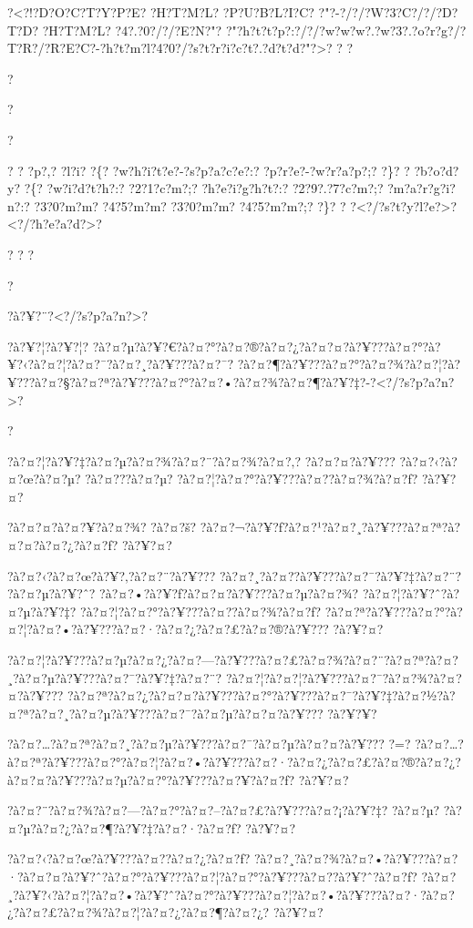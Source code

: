 \documentclass[11pt, openany]{book}
\begin{document}
{{{{{{{?\textless{}?!?D?O?C?T?Y?P?E? ?H?T?M?L? ?P?U?B?L?I?C?
?"?-?/?/?W?3?C?/?/?D?T?D? ?H?T?M?L? ?4?.?0?/?/?E?N?"?
?"?h?t?t?p?:?/?/?w?w?w?.?w?3?.?o?r?g?/?T?R?/?R?E?C?-?h?t?m?l?4?0?/?s?t?r?i?c?t?.?d?t?d?"?\textgreater{}?
? ?

?

?

?

? ? ?p?,? ?l?i? ?\{? ?w?h?i?t?e?-?s?p?a?c?e?:? ?p?r?e?-?w?r?a?p?;? ?\}?
? ?b?o?d?y? ?\{? ?w?i?d?t?h?:? ?2?1?c?m?;? ?h?e?i?g?h?t?:?
?2?9?.?7?c?m?;? ?m?a?r?g?i?n?:? ?3?0?m?m? ?4?5?m?m? ?3?0?m?m?
?4?5?m?m?;? ?\}? ?
?\textless{}?/?s?t?y?l?e?\textgreater{}?\textless{}?/?h?e?a?d?\textgreater{}?

? ? ?

?

?à?¥?¨?\textless{}?/?s?p?a?n?\textgreater{}?

?à?¥?¦?à?¥?¦?
?à?¤?µ?à?¥?€?à?¤?°?à?¤?®?à?¤?¿?à?¤?¤?à?¥???à?¤?°?à?¥?‹?à?¤?¦?à?¤?¯?à?¤?¸?à?¥???à?¤?¯?
?à?¤?¶?à?¥???à?¤?°?à?¤?¾?à?¤?¦?à?¥???à?¤?§?à?¤?ª?à?¥???à?¤?°?à?¤?•?à?¤?¾?à?¤?¶?à?¥?‡?-?\textless{}?/?s?p?a?n?\textgreater{}?

?

?à?¤?¦?à?¥?‡?à?¤?µ?à?¤?¾?à?¤?¨?à?¤?¾?à?¤?‚? ?à?¤?¤?à?¥???
?à?¤?‹?à?¤?œ?à?¤?µ? ?à?¤???à?¤?µ? ?à?¤?¦?à?¤?°?à?¥???à?¤?­?à?¤?¾?à?¤?ƒ?
?à?¥?¤?

?à?¤?¤?à?¤?¥?à?¤?¾? ?à?¤?š?
?à?¤?¬?à?¥?ƒ?à?¤?¹?à?¤?¸?à?¥???à?¤?ª?à?¤?¤?à?¤?¿?à?¤?ƒ? ?à?¥?¤?

?à?¤?‹?à?¤?œ?à?¥?‚?à?¤?¨?à?¥??? ?à?¤?¸?à?¤?­?à?¥???à?¤?¯?à?¥?‡?à?¤?¨?
?à?¤?µ?à?¥?ˆ? ?à?¤?•?à?¥?ƒ?à?¤?¤?à?¥???à?¤?µ?à?¤?¾?
?à?¤?¦?à?¥?ˆ?à?¤?µ?à?¥?‡? ?à?¤?¦?à?¤?°?à?¥???à?¤?­?à?¤?¾?à?¤?ƒ?
?à?¤?ª?à?¥???à?¤?°?à?¤?¦?à?¤?•?à?¥???à?¤?·?à?¤?¿?à?¤?£?à?¤?®?à?¥???
?à?¥?¤?

?à?¤?¦?à?¥???à?¤?µ?à?¤?¿?à?¤?---?à?¥???à?¤?£?à?¤?¾?à?¤?¨?à?¤?ª?à?¤?¸?à?¤?µ?à?¥???à?¤?¯?à?¥?‡?à?¤?¨?
?à?¤?¦?à?¤?¦?à?¥???à?¤?¯?à?¤?¾?à?¤?¤?à?¥???
?à?¤?ª?à?¤?¿?à?¤?¤?à?¥???à?¤?°?à?¥???à?¤?¯?à?¥?‡?à?¤?½?à?¤?ª?à?¤?¸?à?¤?µ?à?¥???à?¤?¯?à?¤?µ?à?¤?¤?à?¥???
?à?¥?¥?

?à?¤?\ldots{}?à?¤?ª?à?¤?¸?à?¤?µ?à?¥???à?¤?¯?à?¤?µ?à?¤?¤?à?¥??? ?=?
?à?¤?\ldots{}?à?¤?ª?à?¥???à?¤?°?à?¤?¦?à?¤?•?à?¥???à?¤?·?à?¤?¿?à?¤?£?à?¤?®?à?¤?¿?à?¤?¤?à?¥???à?¤?µ?à?¤?°?à?¥???à?¤?¥?à?¤?ƒ?
?à?¥?¤?

?à?¤?¨?à?¤?¾?à?¤?---?à?¤?°?à?¤?--?à?¤?£?à?¥???à?¤?¡?à?¥?‡? ?à?¤?µ?
?à?¤?µ?à?¤?¿?à?¤?¶?à?¥?‡?à?¤?·?à?¤?ƒ? ?à?¥?¤?

?à?¤?‹?à?¤?œ?à?¥???à?¤?­?à?¤?¿?à?¤?ƒ?
?à?¤?¸?à?¤?¾?à?¤?•?à?¥???à?¤?·?à?¤?¤?à?¥?ˆ?à?¤?°?à?¥???à?¤?¦?à?¤?°?à?¥???à?¤?­?à?¥?ˆ?à?¤?ƒ?
?à?¤?¸?à?¥?‹?à?¤?¦?à?¤?•?à?¥?ˆ?à?¤?°?à?¥???à?¤?¦?à?¤?•?à?¥???à?¤?·?à?¤?¿?à?¤?£?à?¤?¾?à?¤?¦?à?¤?¿?à?¤?¶?à?¤?¿?
?à?¥?¤?

}}}}}}}
\end{document}
